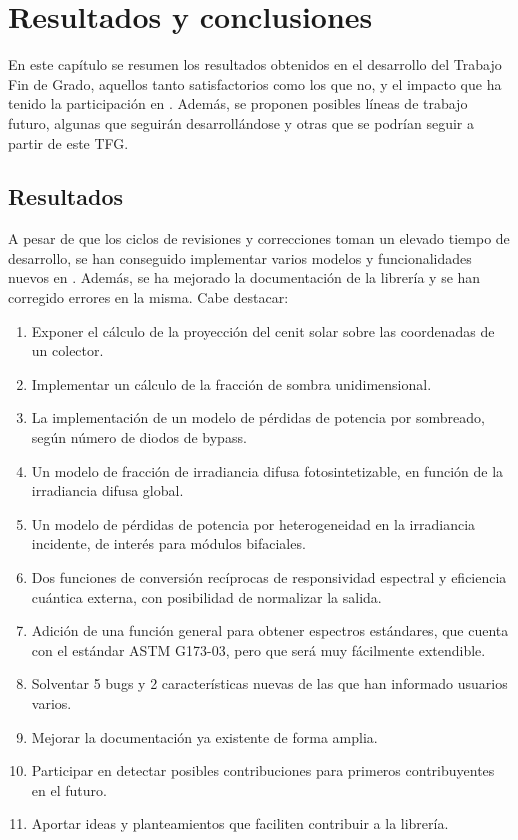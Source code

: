 \chapter{Resultados y conclusiones} \label{chp:resultados}

En este capítulo se resumen los resultados obtenidos en el desarrollo del Trabajo Fin de Grado, aquellos tanto satisfactorios como los que no, y el impacto que ha tenido la participación en \pvlibpy. Además, se proponen posibles líneas de trabajo futuro, algunas que seguirán desarrollándose y otras que se podrían seguir a partir de este TFG.


\section{Resultados} \label{sct:resultados_resultados}

A pesar de que los ciclos de revisiones y correcciones toman un elevado tiempo de desarrollo, se han conseguido implementar varios modelos y funcionalidades nuevos en \pvlibpy. Además, se ha mejorado la documentación de la librería y se han corregido errores en la misma. Cabe destacar:

\begin{enumerate}
    \item Exponer el cálculo de la proyección del cenit solar sobre las coordenadas de un colector.
    \item Implementar un cálculo de la fracción de sombra unidimensional.
    \item La implementación de un modelo de pérdidas de potencia por sombreado, según número de diodos de bypass.
    \item Un modelo de fracción de irradiancia difusa fotosintetizable, en función de la irradiancia difusa global.
    \item Un modelo de pérdidas de potencia por heterogeneidad en la irradiancia incidente, de interés para módulos bifaciales.
    \item Dos funciones de conversión recíprocas de responsividad espectral y eficiencia cuántica externa, con posibilidad de normalizar la salida.
    \item Adición de una función general para obtener espectros estándares, que cuenta con el estándar ASTM G173-03, pero que será muy fácilmente extendible.
    \item Solventar 5 bugs y 2 características nuevas de las que han informado usuarios varios.
    \item Mejorar la documentación ya existente de forma amplia.
    \item Participar en detectar posibles contribuciones para primeros contribuyentes en el futuro.
    \item Aportar ideas y planteamientos que faciliten contribuir a la librería.
\end{enumerate}

